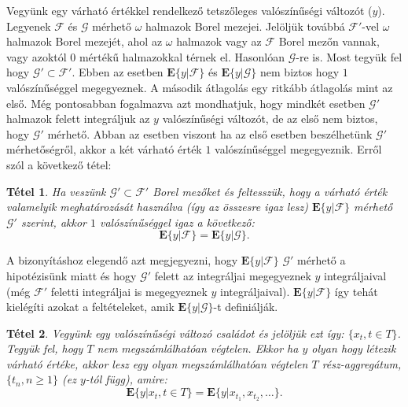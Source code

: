 \documentclass{article}
\newtheorem{theorem}{Tétel}
\begin{document}
Vegyünk egy várható értékkel rendelkező tetszőleges valószínűségi változót ($y$). Legyenek $\mathscr{F}$ és $\mathscr{G}$ mérhető $\omega$ halmazok Borel mezejei. Jelöljük továbbá $\mathscr{F}'$-vel $\omega$ halmazok Borel mezejét, ahol az $\omega$ halmazok vagy az $\mathscr{F}$ Borel mezőn vannak, vagy azoktól $0$ mértékű halmazokkal térnek el. Hasonlóan $\mathscr{G}$-re is. Most tegyük fel hogy $\mathscr{G}' \subset \mathscr{F}'$. Ebben az esetben $\mathrm{\textbf{E}}\{y | \mathscr{F}\}$ és $\mathrm{\textbf{E}}\{y | \mathscr{G}\}$ nem biztos hogy $1$ valószínűséggel megegyeznek. A második átlagolás egy ritkább átlagolás mint az első. Még pontosabban fogalmazva azt mondhatjuk, hogy mindkét esetben $\mathscr{G}'$ halmazok felett integráljuk az $y$ valószínűségi változót, de az első nem biztos, hogy $\mathscr{G}'$ mérhető. Abban az esetben viszont ha az első esetben beszélhetünk $\mathscr{G}'$ mérhetőségről, akkor a két várható érték $1$ valószínűséggel megegyeznik. Erről szól a következő tétel:
\begin{theorem}\label{th:t8-1}
	Ha veszünk $\mathscr{G}' \subset \mathscr{F}'$ Borel mezőket és feltesszük, hogy a várható érték valamelyik meghatározását használva (így az összesre igaz lesz) $\mathrm{\textbf{E}}\{y | \mathscr{F}\}$ mérhető $\mathscr{G}'$ szerint, akkor $1$ valószínűséggel igaz a következő:
\begin{equation}
	\mathrm{\textbf{E}}\{y | \mathscr{F}\} = \mathrm{\textbf{E}}\{y | \mathscr{G}\}.
\end{equation}
\end{theorem}
A bizonyításhoz elegendő azt megjegyezni, hogy $\mathrm{\textbf{E}}\{y | \mathscr{F}\}$ $\mathscr{G}'$ mérhető a hipotézisünk miatt és hogy $\mathscr{G}'$ felett az integráljai megegyeznek $y$ integráljaival (még $\mathscr{F}'$ feletti integráljai is megegyeznek $y$ integráljaival). $\mathrm{\textbf{E}}\{y | \mathscr{F}\}$ így tehát kielégíti azokat a feltételeket, amik $\mathrm{\textbf{E}}\{y | \mathscr{G}\}$-t definiálják. 
\begin{theorem}
	Vegyünk egy valószínűségi változó családot és jelöljük ezt így: $\{x_t, t \in T\}$. Tegyük fel, hogy $T$ nem megszámlálhatóan végtelen. Ekkor ha $y$ olyan hogy létezik várható értéke, akkor lesz egy olyan megszámlálhatóan végtelen $T$ rész-aggregátum, $\{t_n,n \geq 1\}$ (ez $y$-tól függ), amire:
	\begin{equation}
		\mathrm{\textbf{E}}\{y | x_t, t \in T \} = \mathrm{\textbf{E}}\{y | x_{t_1},x_{t_2},\ldots\}.
	\end{equation}
\end{theorem}
\end{document}
